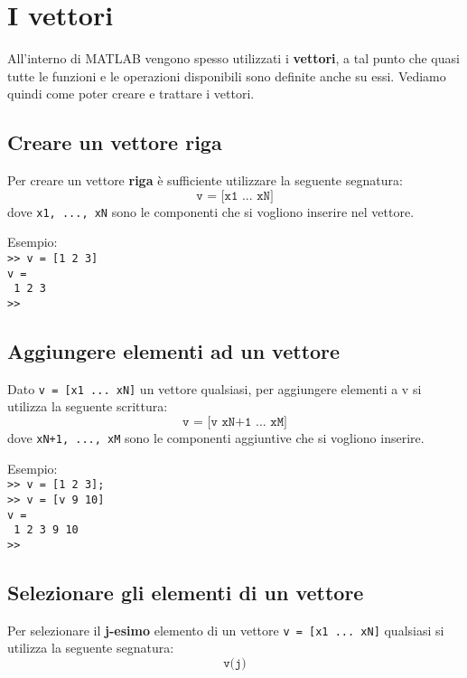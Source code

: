 \chapter{I vettori}
All'interno di MATLAB vengono spesso utilizzati i \textbf{vettori}, a tal punto che quasi tutte le funzioni e le 
operazioni disponibili sono definite anche su essi. Vediamo quindi come poter creare e trattare i vettori.

\section{Creare un vettore riga}
Per creare un vettore \textbf{riga} è sufficiente utilizzare la seguente segnatura:
$$ \texttt{v = [x1 ... xN]} $$
dove \texttt{x1, ..., xN} sono le componenti che si vogliono inserire nel vettore.

Esempio: \\
\texttt{>> v = [1 2 3]} \\
\texttt{v = } \\
\texttt{\hspace{0.5cm} 1 \hspace{0.5cm} 2 \hspace{0.5cm} 3} \\
\texttt{>>}

\section{Aggiungere elementi ad un vettore}
Dato \texttt{v = [x1 ... xN]} un vettore qualsiasi, per aggiungere elementi a v si utilizza la seguente scrittura:
$$ \texttt{v = [v xN+1 ... xM]} $$
dove \texttt{xN+1, ..., xM} sono le componenti aggiuntive che si vogliono inserire.

Esempio: \\
\texttt{>> v = [1 2 3];} \\
\texttt{>> v = [v 9 10]} \\
\texttt{v = } \\
\texttt{\hspace{0.5cm} 1 \hspace{0.5cm} 2 \hspace{0.5cm} 3 \hspace{0.5cm} 9 \hspace{0.5cm} 10} \\
\texttt{>>}

\newpage

\section{Selezionare gli elementi di un vettore}
Per selezionare il \textbf{j-esimo} elemento di un vettore \texttt{v = [x1 ... xN]} qualsiasi si utilizza la seguente 
segnatura:
$$ \texttt{v(j)} $$

